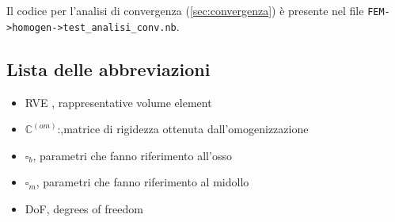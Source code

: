 \documentclass[a4paper,num-refs]{oup-contemporary}
\begin{document}
Il codice per l'analisi di convergenza (\cref{sec:convergenza}) è presente nel file \texttt{FEM->homogen->test\_analisi\_conv.nb}.


\subsection{Lista delle abbreviazioni}

\begin{itemize}
	\item RVE , rappresentative volume element 
	\item $\mathbb C^{(om)}$:,matrice di rigidezza ottenuta dall'omogenizzazione
	\item $\square_b$, parametri che fanno riferimento all'osso
	\item $\square_m$, parametri che fanno riferimento al midollo
	\item DoF, degrees of freedom
\end{itemize}
 








\end{document}

